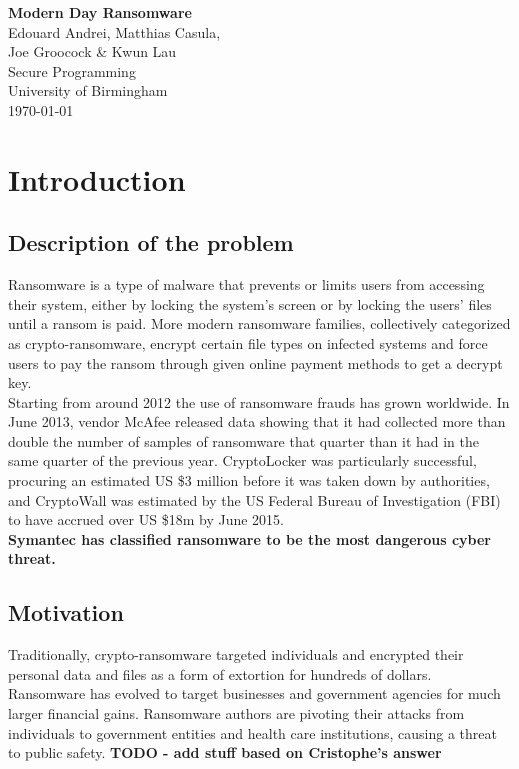 \documentclass[10pt]{article}
\begin{document}
\begin{titlepage}
  \vspace*{\fill}
  \begin{center}
    {\Huge \textbf{Modern Day Ransomware}}\\[0.5cm]
    {\Large Edouard Andrei, Matthias Casula,}\\
    {\Large Joe Groocock \& Kwun Lau}\\[0.6cm]
    {\large Secure Programming}\\
    {\large University of Birmingham}\\[0.4cm]
    {\large \today}
  \end{center}
  \vspace*{\fill}
\end{titlepage}
  
\newpage

\section{Introduction}
\subsection{Description of the problem}
Ransomware is a type of malware that prevents or limits users from accessing their system, either by locking the system's screen or by locking the users' files until a ransom is paid. More modern ransomware families, collectively categorized as crypto-ransomware, encrypt certain file types on infected systems and force users to pay the ransom through given online payment methods to get a decrypt key. \\
\noindent Starting from around 2012 the use of ransomware frauds has grown worldwide. In June 2013, vendor McAfee released data showing that it had collected more than double the number of samples of ransomware that quarter than it had in the same quarter of the previous year. CryptoLocker was particularly successful, procuring an estimated US \$3 million before it was taken down by authorities, and CryptoWall was estimated by the US Federal Bureau of Investigation (FBI) to have accrued over US \$18m by June 2015.\\
\noindent 
\noindent \textbf{Symantec has classified ransomware to be the most dangerous cyber threat.}

\subsection{Motivation}
Traditionally, crypto-ransomware targeted individuals and encrypted their personal data and files as a form of extortion for hundreds of dollars. Ransomware has evolved to target businesses and government agencies for much larger financial gains. Ransomware authors are pivoting their attacks from individuals to government entities and health care institutions, causing a threat to public safety. \textbf{TODO - add stuff based on Cristophe's answer}
\end{document}
